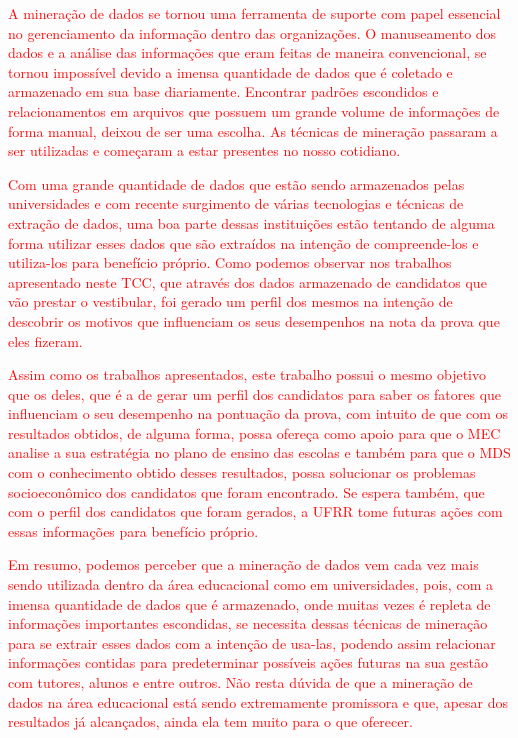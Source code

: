 \label{chapter:consideracoes}


\par 
\textcolor{red}{A mineração de dados se tornou uma ferramenta de suporte com papel essencial no gerenciamento da informação dentro das organizações. O manuseamento dos dados e a análise das informações que eram feitas de maneira convencional, se tornou impossível devido a imensa quantidade de dados que é coletado e armazenado em sua base diariamente. Encontrar padrões escondidos e relacionamentos em arquivos que possuem um grande volume de informações de forma manual, deixou de ser uma escolha. As técnicas de mineração passaram a ser utilizadas e começaram a estar presentes no nosso cotidiano.}

\par
\textcolor{red}{Com uma grande quantidade de dados que estão sendo armazenados pelas universidades e com recente surgimento de várias tecnologias e técnicas de extração de dados, uma boa parte dessas instituições estão tentando de alguma forma utilizar esses dados que são extraídos  na intenção de compreende-los e utiliza-los para benefício próprio. Como podemos observar nos trabalhos apresentado neste TCC, que através dos dados armazenado de candidatos que vão prestar o vestibular, foi gerado um perfil dos mesmos na intenção de descobrir os motivos que influenciam os seus desempenhos na nota da prova que eles fizeram.}

\par
\textcolor{red}{Assim como os trabalhos apresentados, este trabalho possui o mesmo objetivo que os deles, que é a de gerar um perfil dos candidatos para saber os fatores que influenciam o seu desempenho na pontuação da prova, com intuito de que com os resultados obtidos, de alguma forma, possa ofereça como apoio para que o MEC analise a sua estratégia no plano de ensino das escolas e também para que o MDS com o conhecimento obtido desses resultados, possa solucionar os problemas socioeconômico dos candidatos que foram encontrado. Se espera também, que com o perfil dos candidatos que foram gerados, a UFRR tome futuras ações com essas informações para benefício próprio.}

\textcolor{red}{Em resumo, podemos perceber que a mineração de dados vem  cada vez mais sendo utilizada dentro da área educacional como em universidades, pois, com a imensa quantidade de dados que é armazenado, onde muitas vezes é repleta de informações importantes escondidas, se necessita dessas técnicas de mineração para se extrair esses dados com a intenção de usa-las, podendo assim relacionar informações contidas para predeterminar possíveis ações futuras na sua gestão com tutores, alunos e entre outros. Não resta dúvida de que a mineração de dados na área educacional está sendo extremamente promissora e que, apesar dos resultados já alcançados, ainda ela tem muito para o que oferecer.}

